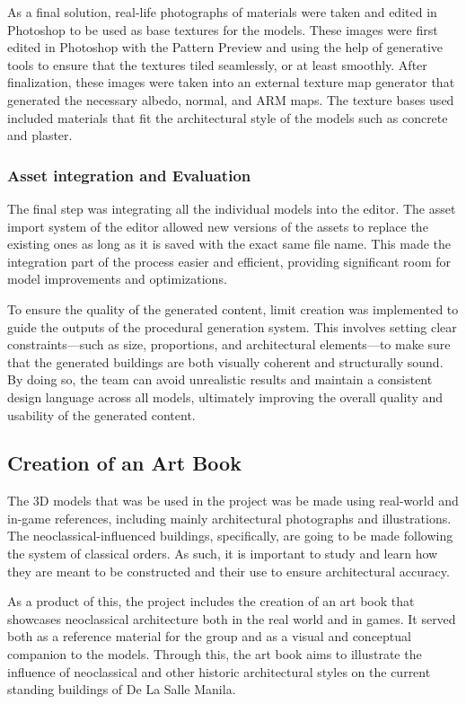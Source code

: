 \documentclass[manuscript,screen,12pt]{article}
\begin{document}
As a final solution, real-life photographs of materials were taken and edited in Photoshop to be used as base textures for the models. These images were first edited in Photoshop with the Pattern Preview and using the help of generative tools to ensure that the textures tiled seamlessly, or at least smoothly. After finalization, these images were taken into an external texture map generator that generated the necessary albedo, normal, and ARM maps. The texture bases used included materials that fit the architectural style of the models such as concrete and plaster.

\subsubsection{Asset integration and Evaluation}

The final step was integrating all the individual models into the editor. The asset import system of the editor allowed new versions of the assets to replace the existing ones as long as it is saved with the exact same file name. This made the integration part of the process easier and efficient, providing significant room for model improvements and optimizations.

To ensure the quality of the generated content, limit creation was implemented to guide the outputs of the procedural generation system. This involves setting clear constraints—such as size, proportions, and architectural elements—to make sure that the generated buildings are both visually coherent and structurally sound. By doing so, the team can avoid unrealistic results and maintain a consistent design language across all models, ultimately improving the overall quality and usability of the generated content.

\subsection{Creation of an Art Book}

The 3D models that was be used in the project was be made using real-world and in-game references, including mainly architectural photographs and illustrations. The neoclassical-influenced buildings, specifically, are going to be made following the system of classical orders. As such, it is important to study and learn how they are meant to be constructed and their use to ensure architectural accuracy.

As a product of this, the project includes the creation of an art book that showcases neoclassical architecture both in the real world and in games. It served both as a reference material for the group and as a visual and conceptual companion to the models. Through this, the art book aims to illustrate the influence of neoclassical and other historic architectural styles on the current standing buildings of De La Salle Manila.
\end{document}
